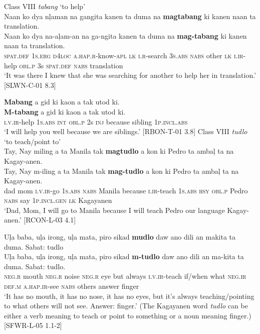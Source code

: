 \ea
Class VIII \textit{tabang} ‘to help’ \\
Naan  ko  dya  nļaman  na  gangita  kanen  ta  duma na  \textbf{magtabang}  ki  kanen  naan  ta  translation. \\\smallskip
\gll Naan  ko  dya  na-aļam-an  na  ga-ngita  kanen  ta  duma na  \textbf{mag-tabang}  ki  kanen  naan  ta  translation. \\
\textsc{spat.def}  1\textsc{s.erg}  \textsc{d}4\textsc{loc}  \textsc{a.hap.r}-know-\textsc{apl}  \textsc{lk}  \textsc{i.r}-search  3\textsc{s.abs}  \textsc{nabs}  other
\textsc{lk}  \textsc{i.ir}-help  \textsc{obl.p}  3s  \textsc{spat.def}  \textsc{nabs}  translation \\
\glt ‘It was there I knew that she was searching for another to help her in translation.’ [SLWN-C-01 8.3]
\z

\ea
\textbf{Mabang}  a  gid  ki  kaon  a  tak  utod  ki. \\\smallskip
\gll \textbf{M-tabang}  a  gid  ki  kaon  a  tak  utod  ki. \\
  \textsc{i.v.ir}-help  1\textsc{s.abs}  \textsc{int}  \textsc{obl.p}  2s  \textsc{inj}  because  sibling  1\textsc{p.incl.abs} \\
\glt  ‘I will help you well because we are siblings.’ [RBON-T-01 3.8]
\z
\ea
Class VIII \textit{tudlo} ‘to teach/point to’ \\
  Tay,  Nay  miling  a  ta  Manila  tak  \textbf{magtudlo}  a  kon   ki  Pedro  ta  ambaļ  ta  na  Kagay-anen. \\\smallskip
\gll Tay,  Nay  m-iling  a  ta  Manila  tak  \textbf{mag-tudlo}  a  kon   ki  Pedro  ta  ambaļ  ta  na  Kagay-anen. \\
  dad  mom  \textsc{i.v.ir}-go  1\textsc{s.abs}  \textsc{nabs}  Manila  because  \textsc{i.ir}-teach  1\textsc{s.abs}  \textsc{hsy}
 \textsc{obl.p}   Pedro  \textsc{nabs}  say  1\textsc{p.incl.gen}  \textsc{lk}  Kagayanen \\
\glt  ‘Dad, Mom, I will go to Manila because I will teach Pedro our language Kagay-anen.’ [RCON-L-03 4.1]
\z

\newpage
\ea
\label{bkm:Ref150430302}
Uļa  baba,  uļa  irong,  uļa  mata,  piro  sikad  \textbf{mudlo}  daw  ano   dili  an  makita  ta  duma.  Sabat:  tudlo \\\smallskip
\gll Uļa  baba,  uļa  irong,  uļa  mata,  piro  sikad  \textbf{m-tudlo}  daw  ano\footnotemark{}   dili  an  ma-kita  ta  duma.  Sabat:  tudlo. \\
  \textsc{neg.r}  mouth  \textsc{neg.r}  noise  \textsc{neg.r}  eye  but  always  \textsc{i.v.ir}-teach  if/when  what
  \textsc{neg.ir}  \textsc{def.m}  \textsc{a.hap.ir}-see  \textsc{nabs}  others  answer finger \\
\glt  ‘It has no mouth, it has no nose, it has no eyes, but it’s always teaching/pointing to what others will not see. Answer: finger.’ (The Kagayanen word \textit{tudlo} can be either a verb meaning to teach or point to something or a noun meaning finger.) [SFWR-L-05 1.1-2]
\z

